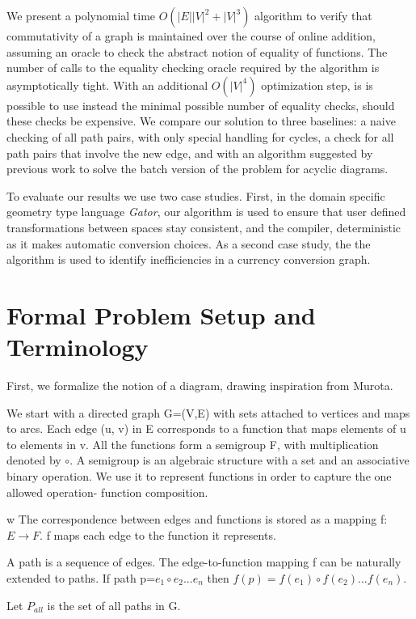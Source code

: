\documentclass[runningheads]{llncs}
\begin{document}
We present a polynomial time $O(|E||V|^2+|V|^3)$ algorithm to verify that commutativity of a graph is maintained over the course of online addition, assuming an oracle to check the abstract notion of equality of functions. The number of calls to the equality checking oracle required by the algorithm is asymptotically tight. With an additional $O(|V|^4)$ optimization step, is is possible to use instead the minimal possible number of equality checks, should these checks be expensive. We compare our solution to three baselines: a naive checking of all path pairs, with only special handling for cycles, a check for all path pairs that involve the new edge, and with an algorithm suggested by previous work to solve the batch version of the problem for acyclic diagrams.

To evaluate our results we use two case studies.
First, in the domain specific geometry type language \textit{Gator}, our algorithm is used to ensure that user defined transformations between spaces stay consistent, and the compiler, deterministic as it makes automatic conversion choices. As a second case study, the the algorithm is used to identify inefficiencies in a currency conversion graph.

\section{Formal Problem Setup and Terminology}

First, we formalize the notion of a diagram, drawing inspiration from Murota\cite{commutative}.

We start with a directed graph G=(V,E) with sets attached to vertices and maps to arcs. Each edge (u, v) in E corresponds to a function that maps elements of u to elements in v.
All the functions form a semigroup F, with multiplication denoted by $\circ$.
A semigroup is an algebraic structure with a set and an associative binary operation. We use it to represent functions in order to capture the one allowed operation- function composition.

w
The correspondence between edges and functions is stored as a mapping f:$E\rightarrow F$. f maps each edge to the function it represents.

A path is a sequence of edges. The edge-to-function mapping f can be naturally extended to paths. If path p=$e_1\circ e_2 ... e_n$ then $f(p)=f(e_1) \circ f(e_2) ... f(e_n)$.

Let $P_{all}$ is the set of all paths in G.
\end{document}
